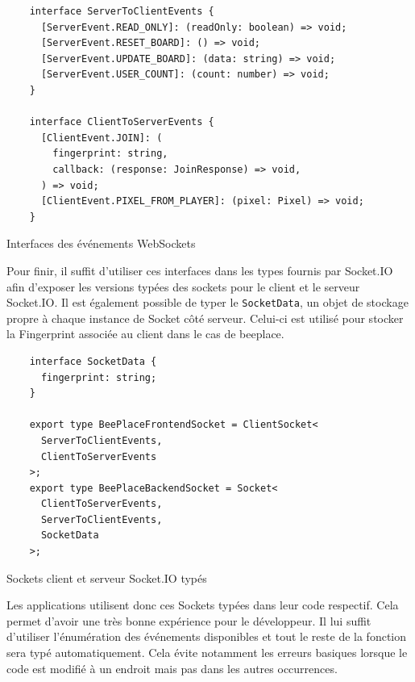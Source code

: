 \begin{listing}[H]
  \begin{verbatim}
    interface ServerToClientEvents {
      [ServerEvent.READ_ONLY]: (readOnly: boolean) => void;
      [ServerEvent.RESET_BOARD]: () => void;
      [ServerEvent.UPDATE_BOARD]: (data: string) => void;
      [ServerEvent.USER_COUNT]: (count: number) => void;
    }

    interface ClientToServerEvents {
      [ClientEvent.JOIN]: (
        fingerprint: string,
        callback: (response: JoinResponse) => void,
      ) => void;
      [ClientEvent.PIXEL_FROM_PLAYER]: (pixel: Pixel) => void;
    }
\end{verbatim}
  \caption{Interfaces des événements WebSockets}
  \label{listing:websockets-events-interfaces}
\end{listing}

Pour finir, il suffit d'utiliser ces interfaces dans les types fournis par Socket.IO afin d'exposer les versions typées des sockets pour le client et le serveur Socket.IO. Il est également possible de typer le \texttt{SocketData}, un objet de stockage propre à chaque instance de Socket côté serveur. Celui-ci est utilisé pour stocker la Fingerprint associée au client dans le cas de \gls{beeplace}.

\begin{listing}[H]
  \begin{verbatim}
    interface SocketData {
      fingerprint: string;
    }

    export type BeePlaceFrontendSocket = ClientSocket<
      ServerToClientEvents,
      ClientToServerEvents
    >;
    export type BeePlaceBackendSocket = Socket<
      ClientToServerEvents,
      ServerToClientEvents,
      SocketData
    >;
\end{verbatim}
  \caption{Sockets client et serveur Socket.IO typés}
  \label{listing:typed-socket-io}
\end{listing}

Les applications utilisent donc ces Sockets typées dans leur code respectif. Cela permet d'avoir une très bonne expérience pour le développeur. Il lui suffit d'utiliser l'énumération des événements disponibles et tout le reste de la fonction sera typé automatiquement. Cela évite notamment les erreurs basiques lorsque le code est modifié à un endroit mais pas dans les autres occurrences.
